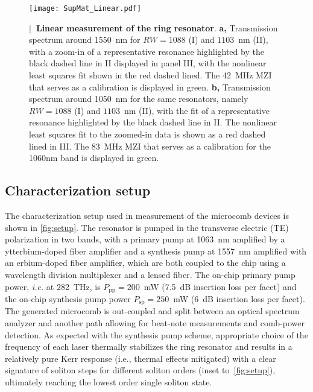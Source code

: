\documentclass[reprint,superscriptaddress, amsmath,amssymb,pra, aps,floatfix,longbibliography]{revtex4-1}
\begin{document}
\begin{figure*}[!t]
 \begin{center}
  \texttt{[image: SupMat\_Linear.pdf]}
 \end{center}
 \caption{\label{fig:linear}\textbf{$|$~Linear measurement of the ring resonator}. \textbf{a,} Transmission spectrum around 1550~nm for $RW=1088$ (I) and $1103$~nm (II), with a zoom-in of a representative resonance highlighted by the black dashed line in II displayed in panel III, with the nonlinear least squares fit shown in the red dashed lined. The 42~MHz MZI that serves as a calibration is displayed in green. \textbf{b,} Transmission spectrum around 1050~nm for the same resonators, namely $RW=1088$ (I) and $1103$~nm (II), with the fit of a representative resonance highlighted by the black dashed line in II. The nonlinear least squares fit to the zoomed-in data is shown as a red dashed lined in III. The 83~MHz MZI that serves as a calibration for the 1060nm band is displayed in green.}
\end{figure*}

\subsection{Characterization setup}

The characterization setup used in measurement of the microcomb devices is shown in \cref{fig:setup}. The resonator is pumped in the transverse electric (TE) polarization in two bands, with a primary pump at 1063~nm amplified by a ytterbium-doped fiber amplifier and a synthesis pump at 1557~nm amplified with an erbium-doped fiber amplifier, which are both coupled to the chip using a wavelength division multiplexer and a lensed fiber. The on-chip primary pump power, \textit{i.e.} at 282~THz, is $P_\mathrm{pp}=200$~mW (7.5~dB insertion loss per facet) and the on-chip synthesis pump power $P_\mathrm{sp}=250$~mW (6~dB insertion loss per facet). The generated microcomb is out-coupled and split between an optical spectrum analyzer and another path allowing for beat-note measurements and comb-power detection. As expected with the synthesis pump scheme, appropriate choice of the frequency of each laser thermally stabilizes the ring resonator and results in a relatively pure Kerr response (i.e., thermal effects mitigated) with a clear signature of soliton steps for different soliton orders (inset to~\cref{fig:setup}), ultimately reaching the lowest order single soliton state.\\
\end{document}
